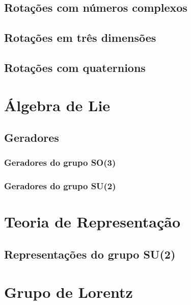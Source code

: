 \documentclass{article}
\numberwithin{equation}{section}
\numberwithin{figure}{section}
\begin{document}
\subsection{Rotações com números complexos}
\subsection{Rotações em três dimensões}
\subsection{Rotações com quaternions}
\section{Álgebra de Lie}
\subsection{Geradores}
\subsubsection{Geradores do grupo SO(3)}
\subsubsection{Geradores do grupo SU(2)}
\section{Teoria de Representação}
\subsection{Representações do grupo SU(2)}
\section{Grupo de Lorentz}


\pagebreak
\nocite{*}


\end{document}
